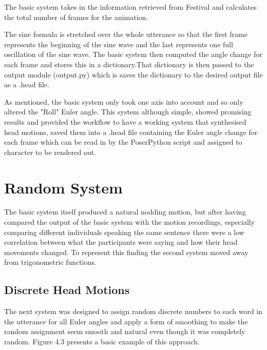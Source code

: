 \documentclass[bsc,frontabs,twoside,singlespacing,parskip,deptreport]{infthesis}
\begin{document}
The basic system takes in the information retrieved from Festival and calculates the total number of frames for the animation.

The sine formula is stretched over the whole utterance so that the first frame represents the beginning of the sine wave and the last represents one full oscillation of the sine wave. The basic system then computed the angle change for each frame and stores this in a dictionary.That dictionary is then passed to the output module (output.py) which is saves the dictionary to the desired output file as a .head file.

As mentioned, the basic system only took one axis into account and so only altered the "Roll" Euler angle. This system although simple, showed promising results and provided the workflow to have a working system that synthesised head motions, saved them into a .head file containing the Euler angle change for each frame which can be read in by the PoserPython script and assigned to character to be rendered out.

\section{Random System}

The basic system itself produced a natural nodding motion, but after having compared the output of the basic system with the motion recordings, especially comparing different individuals speaking the same sentence there were a low correlation between what the participants were saying and how their head movements changed. To represent this finding the second system moved away from trigonometric functions.

\subsection{Discrete Head Motions}

The next system was designed to assign random discrete numbers to each word in the utterance for all Euler angles and apply a form of smoothing to make the random assignment seem smooth and natural even though it was completely random. Figure 4.3 presents a basic example of this approach.
\end{document}
